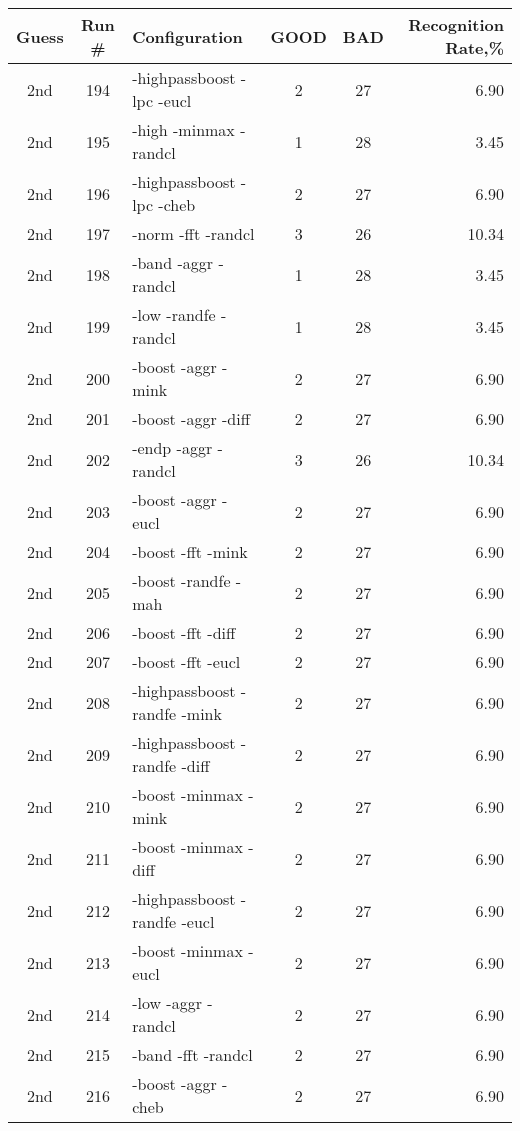 \begin{table}
\begin{minipage}[b]{\textwidth}
\centering
\begin{tabular}{|c|c|l|c|c|r|} \hline
Guess & Run \# & Configuration & GOOD & BAD & Recognition Rate,\%\\ \hline\hline
2nd & 194 & -highpassboost -lpc -eucl  & 2 & 27 & 6.90\\ \hline
2nd & 195 & -high -minmax -randcl  & 1 & 28 & 3.45\\ \hline
2nd & 196 & -highpassboost -lpc -cheb  & 2 & 27 & 6.90\\ \hline
2nd & 197 & -norm -fft -randcl  & 3 & 26 & 10.34\\ \hline
2nd & 198 & -band -aggr -randcl  & 1 & 28 & 3.45\\ \hline
2nd & 199 & -low -randfe -randcl  & 1 & 28 & 3.45\\ \hline
2nd & 200 & -boost -aggr -mink  & 2 & 27 & 6.90\\ \hline
2nd & 201 & -boost -aggr -diff  & 2 & 27 & 6.90\\ \hline
2nd & 202 & -endp -aggr -randcl  & 3 & 26 & 10.34\\ \hline
2nd & 203 & -boost -aggr -eucl  & 2 & 27 & 6.90\\ \hline
2nd & 204 & -boost -fft -mink  & 2 & 27 & 6.90\\ \hline
2nd & 205 & -boost -randfe -mah  & 2 & 27 & 6.90\\ \hline
2nd & 206 & -boost -fft -diff  & 2 & 27 & 6.90\\ \hline
2nd & 207 & -boost -fft -eucl  & 2 & 27 & 6.90\\ \hline
2nd & 208 & -highpassboost -randfe -mink  & 2 & 27 & 6.90\\ \hline
2nd & 209 & -highpassboost -randfe -diff  & 2 & 27 & 6.90\\ \hline
2nd & 210 & -boost -minmax -mink  & 2 & 27 & 6.90\\ \hline
2nd & 211 & -boost -minmax -diff  & 2 & 27 & 6.90\\ \hline
2nd & 212 & -highpassboost -randfe -eucl  & 2 & 27 & 6.90\\ \hline
2nd & 213 & -boost -minmax -eucl  & 2 & 27 & 6.90\\ \hline
2nd & 214 & -low -aggr -randcl  & 2 & 27 & 6.90\\ \hline
2nd & 215 & -band -fft -randcl  & 2 & 27 & 6.90\\ \hline
2nd & 216 & -boost -aggr -cheb  & 2 & 27 & 6.90\\ \hline

\end{tabular}
\end{minipage}
\end{table}
